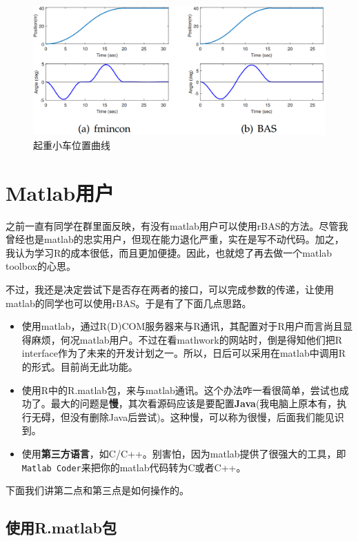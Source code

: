 \documentclass[]{ctexbook}
\providecommand{\tightlist}{%
  \setlength{\itemsep}{0pt}\setlength{\parskip}{0pt}}
\theoremstyle{definition}
\theoremstyle{definition}
\theoremstyle{definition}
\theoremstyle{remark}
\begin{document}
\begin{figure}

{\centering \includegraphics[width=0.7\linewidth]{img/ex2_3} 

}

\caption{起重小车位置曲线}\label{fig:ex2position}
\end{figure}

\chapter{Matlab用户}\label{matlabr}

之前一直有同学在群里面反映，有没有matlab用户可以使用rBAS的方法。尽管我曾经也是matlab的忠实用户，但现在能力退化严重，实在是写不动代码。加之，我认为学习R的成本很低，而且更加便捷。因此，也就熄了再去做一个matlab
toolbox的心思。

不过，我还是决定尝试下是否存在两者的接口，可以完成参数的传递，让使用matlab的同学也可以使用rBAS。于是有了下面几点思路。

\begin{itemize}
\tightlist
\item
  使用matlab，通过R(D)COM服务器来与R通讯，其配置对于R用户而言尚且显得麻烦，何况matlab用户。不过在看mathwork的网站时，倒是得知他们把R
  interface作为了未来的开发计划之一。所以，日后可以采用在matlab中调用R的形式。目前尚无此功能。
\item
  使用R中的R.matlab包，来与matlab通讯。这个办法咋一看很简单，尝试也成功了。最大的问题是\textbf{慢}，其次看源码应该是要配置\textbf{Java}(我电脑上原本有，执行无碍，但没有删除Java后尝试)。这种慢，可以称为很慢，后面我们能见识到。
\item
  使用\textbf{第三方语言}，如C/C++。别害怕，因为matlab提供了很强大的工具，即\texttt{Matlab\ Coder}来把你的matlab代码转为C或者C++。
\end{itemize}

下面我们讲第二点和第三点是如何操作的。

\section{使用R.matlab包}\label{r.matlab}
\end{document}
